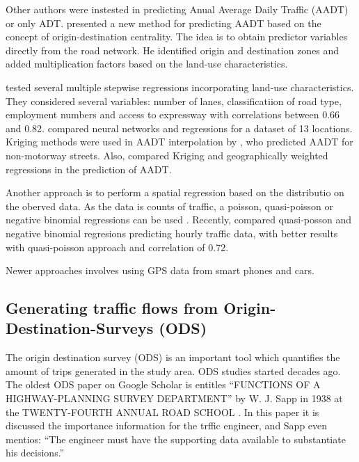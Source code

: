 \documentclass[12pt,graybox,envcountchap,sectrefs]{krantz}
\theoremstyle{definition}
\theoremstyle{definition}
\theoremstyle{definition}
\theoremstyle{remark}
\begin{document}
Other authors were instested in predicting Anual Average Daily Traffic
(AADT) or only ADT. \citet{lowry2014spatial} presented a new method for
predicting AADT based on the concept of origin-destination centrality.
The idea is to obtain predictor variables directly from the road
network. He identified origin and destination zones and added
multiplication factors based on the land-use characteristics.

\citet{zhao2001contributing} tested several multiple stepwise
regressions incorporating land-use characteristics. They considered
several variables: number of lanes, classificatiion of road type,
employment numbers and access to expressway with correlations between
0.66 and 0.82. \citet{lam2000estimation} compared neural networks and
regressions for a dataset of 13 locations. Kriging methods were used in
AADT interpolation by \citet{eom2006improving}, who predicted AADT for
non-motorway streets. Also, \citet{selby2013spatial} compared Kriging
and geographically weighted regressions in the prediction of AADT.

Another approach is to perform a spatial regression based on the
distributio on the oberved data. As the data is counts of traffic, a
poisson, quasi-poisson or negative binomial regressions can be used
\citep{zeileis2008regression}. Recently, \citet{Ibarraetal2017a}
compared quasi-posson and negative binomial regresions predicting hourly
traffic data, with better results with quasi-poisson approach and
correlation of 0.72.

Newer approaches involves using GPS data from smart phones and cars.

\subsection{Generating traffic flows from Origin-Destination-Surveys
(ODS)}\label{generating-traffic-flows-from-origin-destination-surveys-ods}

The origin destination survey (ODS) is an important tool which
quantifies the amount of trips generated in the study area. ODS studies
started decades ago. The oldest ODS paper on Google Scholar is entitles
``FUNCTIONS OF A HIGHWAY-PLANNING SURVEY DEPARTMENT'' by W. J. Sapp in
1938 at the TWENTY-FOURTH ANNUAL ROAD SCHOOL \citep{sapp1938runctions}.
In this paper it is discussed the importance information for the trffic
engineer, and Sapp even mentios: ``The engineer must have the supporting
data available to substantiate his decisions.''
\end{document}
